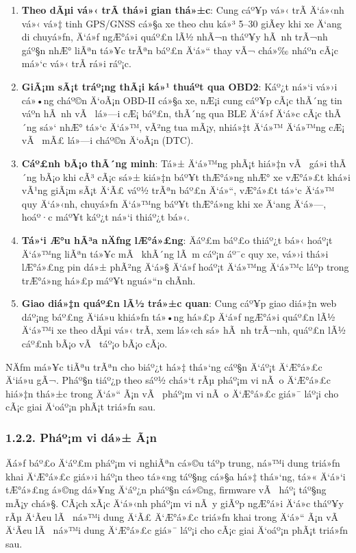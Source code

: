 \documentclass[a4paper]{extarticle}
\providecommand{\tightlist}{%
  \setlength{\itemsep}{0pt}\setlength{\parskip}{0pt}}
\begin{document}
\begin{enumerate}
\def\labelenumi{\arabic{enumi}.}
\tightlist
\item
  \textbf{Theo dÃµi vá»‹ trÃ­ thá»i gian thá»±c}: Cung cáº¥p vá»‹ trÃ­ Ä‘á»‹nh vá»‹ vá»‡
  tinh GPS/GNSS cá»§a xe theo chu ká»³ 5--30 giÃ¢y khi xe Ä‘ang di chuyá»ƒn, Ä‘á»ƒ
  ngÆ°á»i quáº£n lÃ½ nhÃ¬n tháº¥y hÃ nh trÃ¬nh gáº§n nhÆ° liÃªn tá»¥c trÃªn báº£n Ä‘á»“ thay
  vÃ¬ chá»‰ nháº­n cÃ¡c má»‘c vá»‹ trÃ­ rá»i ráº¡c.
\item
  \textbf{GiÃ¡m sÃ¡t tráº¡ng thÃ¡i ká»¹ thuáº­t qua OBD2}: Káº¿t ná»‘i vá»›i cá»•ng cháº©n
  Ä‘oÃ¡n OBD-II cá»§a xe, nÆ¡i cung cáº¥p cÃ¡c thÃ´ng tin váº­n hÃ nh vÃ  lá»—i cÆ¡ báº£n,
  thÃ´ng qua BLE Ä‘á»ƒ Ä‘á»c cÃ¡c thÃ´ng sá»‘ nhÆ° tá»‘c Ä‘á»™, vÃ²ng tua mÃ¡y, nhiá»‡t Ä‘á»™
  Ä‘á»™ng cÆ¡ vÃ  mÃ£ lá»—i cháº©n Ä‘oÃ¡n (DTC).
\item
  \textbf{Cáº£nh bÃ¡o thÃ´ng minh}: Tá»± Ä‘á»™ng phÃ¡t hiá»‡n vÃ  gá»­i thÃ´ng bÃ¡o khi
  cÃ³ cÃ¡c sá»± kiá»‡n báº¥t thÆ°á»ng nhÆ° xe vÆ°á»£t khá»i vÃ¹ng giÃ¡m sÃ¡t Ä‘Ã£ váº½ trÃªn
  báº£n Ä‘á»“, vÆ°á»£t tá»‘c Ä‘á»™ quy Ä‘á»‹nh, chuyá»ƒn Ä‘á»™ng báº¥t thÆ°á»ng khi xe Ä‘ang Ä‘á»—,
  hoáº·c máº¥t káº¿t ná»‘i thiáº¿t bá»‹.
\item
  \textbf{Tá»‘i Æ°u hÃ³a nÄƒng lÆ°á»£ng}: Äáº£m báº£o thiáº¿t bá»‹ hoáº¡t Ä‘á»™ng liÃªn tá»¥c mÃ 
  khÃ´ng lÃ m cáº¡n áº¯c quy xe, vá»›i thá»i lÆ°á»£ng pin dá»± phÃ²ng Ä‘á»§ Ä‘á»ƒ hoáº¡t Ä‘á»™ng
  Ä‘á»™c láº­p trong trÆ°á»ng há»£p máº¥t nguá»“n chÃ­nh.
\item
  \textbf{Giao diá»‡n quáº£n lÃ½ trá»±c quan}: Cung cáº¥p giao diá»‡n web dáº¡ng báº£ng
  Ä‘iá»u khiá»ƒn tá»•ng há»£p Ä‘á»ƒ ngÆ°á»i quáº£n lÃ½ Ä‘á»™i xe theo dÃµi vá»‹ trÃ­, xem lá»‹ch
  sá»­ hÃ nh trÃ¬nh, quáº£n lÃ½ cáº£nh bÃ¡o vÃ  táº¡o bÃ¡o cÃ¡o.
\end{enumerate}

NÄƒm má»¥c tiÃªu trÃªn cho biáº¿t há»‡ thá»‘ng cáº§n Ä‘áº¡t Ä‘Æ°á»£c Ä‘iá»u gÃ¬. Pháº§n tiáº¿p theo
sáº½ chá»‘t rÃµ pháº¡m vi nÃ o Ä‘Æ°á»£c hiá»‡n thá»±c trong Ä‘á»“ Ã¡n vÃ  pháº¡m vi nÃ o Ä‘Æ°á»£c
giá»¯ láº¡i cho cÃ¡c giai Ä‘oáº¡n phÃ¡t triá»ƒn sau.

\subsubsection{1.2.2. Pháº¡m vi dá»±
Ã¡n}\label{122-phux1ea1m-vi-dux1ef1-uxe1n}

Äá»ƒ báº£o Ä‘áº£m pháº¡m vi nghiÃªn cá»©u táº­p trung, ná»™i dung triá»ƒn khai Ä‘Æ°á»£c giá»›i
háº¡n theo tá»«ng táº§ng cá»§a há»‡ thá»‘ng, tá»« Ä‘á»‘i tÆ°á»£ng á»©ng dá»¥ng Ä‘áº¿n pháº§n cá»©ng,
firmware vÃ  háº¡ táº§ng mÃ¡y chá»§. CÃ¡ch xÃ¡c Ä‘á»‹nh pháº¡m vi nÃ y giÃºp ngÆ°á»i Ä‘á»c
tháº¥y rÃµ Ä‘Ã¢u lÃ  ná»™i dung Ä‘Ã£ Ä‘Æ°á»£c triá»ƒn khai trong Ä‘á»“ Ã¡n vÃ  Ä‘Ã¢u lÃ  ná»™i
dung Ä‘Æ°á»£c giá»¯ láº¡i cho cÃ¡c giai Ä‘oáº¡n phÃ¡t triá»ƒn sau.
\end{document}
